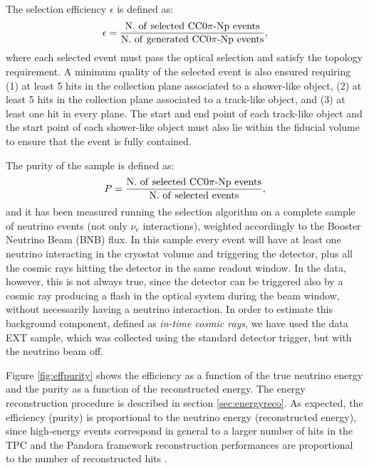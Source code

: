The selection efficiency $\epsilon$ is defined as:
\begin{equation}
\epsilon = \frac{\mathrm{N.~of~selected~CC0}\pi\mathrm{{\text -}Np~events}}{\mathrm{N.~of~generated~CC0}\pi\mathrm{{\text -}Np~events}},
\end{equation}
where each selected event must pass the optical selection and satisfy the topology requirement. A minimum quality of the selected event is also ensured requiring (1) at least 5 hits in the collection plane associated to a shower-like object, (2) at least 5 hits in the collection plane associated to a track-like object, and (3) at least one hit in every plane.
The start and end point of each track-like object and the start point of each shower-like object must also lie within the fiducial volume to ensure that the event is fully contained.

The purity of the sample is defined as:
\begin{equation}
P = \frac{\mathrm{N.~of~selected~CC0}\pi\mathrm{{\text -}Np~events}}{\mathrm{N.~of~selected~events}},
\end{equation}
and it has been measured running the selection algorithm on a complete sample of neutrino events (not only $\nu_{e}$ interactions), weighted accordingly to the Booster Neutrino Beam (BNB) flux. In this sample every event will have at least one neutrino interacting in the cryostat volume and triggering the detector, plus all the cosmic rays hitting the detector in the same readout window. In the data, however, this is not always true, since the detector can be triggered also by a cosmic ray producing a flash in the optical system during the beam window, without necessarily having a neutrino interaction. In order to estimate this background component, defined as \emph{in-time cosmic rays}, we have used the data EXT sample, which was collected using the standard detector trigger, but with the neutrino beam off.

Figure \ref{fig:effpurity} shows the efficiency as a function of the true neutrino energy and the purity as a function of the reconstructed energy. The energy reconstruction procedure is described in section \ref{sec:energyreco}.
As expected, the efficiency (purity) is proportional to the neutrino energy (reconstructed energy), since high-energy events correspond in general to a larger number of hits in the TPC and the Pandora framework reconstruction performances are proportional to the number of reconstructed hits 
\cite{pandora2}. 

